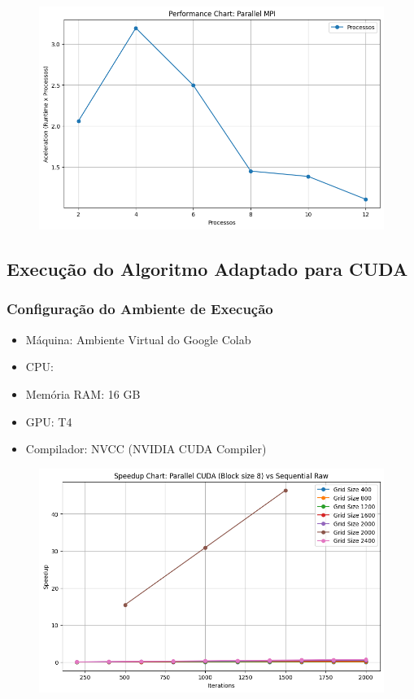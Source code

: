 \begin{figure}[H]
    \centering
    \includegraphics[width=1\linewidth]{./image copy 4.png}
    \label{fig:Runtimexblock}
\end{figure}

\subsection{Execução do Algoritmo Adaptado para CUDA}
\subsubsection{Configuração do Ambiente de Execução}
\begin{itemize}
    \item Máquina: Ambiente Virtual do Google Colab
    \item CPU:
    \item Memória RAM: 16 GB
    \item GPU: T4
    \item Compilador: NVCC (NVIDIA CUDA Compiler)
\end{itemize}

\begin{figure}[H]
    \centering
    \includegraphics[width=1\linewidth]{./image copy 5.png}
    \label{fig:Runtimexblock}
\end{figure}

